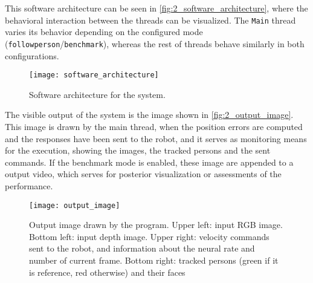 This software architecture can be seen in \autoref{fig:2_software_architecture}, where the behavioral interaction between the threads can be visualized. The \texttt{Main} thread varies its behavior depending on the configured mode (\texttt{followperson}/\texttt{benchmark}), whereas the rest of threads  behave similarly in both configurations.

\begin{figure}[h]
	\centering
	\texttt{[image: software\_architecture]}
	\caption{Software architecture for the system.}
	\label{fig:2_software_architecture}
\end{figure}



The visible output of the system is the image shown in \autoref{fig:2_output_image}. This image is drawn by the main thread, when the position errors are computed and the responses have been sent to the robot, and it serves as monitoring means for the execution, showing the images, the tracked persons and the sent commands. If the benchmark mode is enabled, these image are appended to a output video, which serves for posterior visualization or assessments of the performance.

\begin{figure}[h]
	\centering
	\texttt{[image: output\_image]}
	\caption{Output image drawn by the program. Upper left: input RGB image. Bottom left: input depth image. Upper right: velocity commands sent to the robot, and information about the neural rate and number of current frame. Bottom right: tracked persons (green if it is reference, red otherwise) and their faces}
	\label{fig:2_output_image}
\end{figure}




